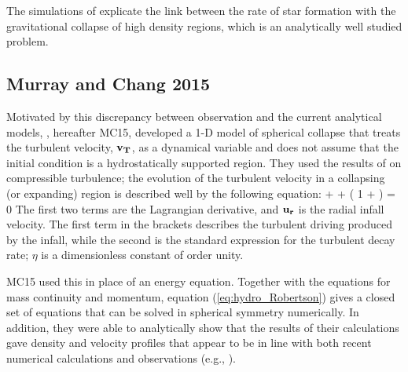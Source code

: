 \documentclass[../dissertation.tex]{subfiles}
\begin{document}
The simulations of  \citet{2015ApJ...800...49L} explicate the link between the rate of star formation with the gravitational collapse of high density regions, which  is  an analytically well studied problem. 

\subsection{Murray and Chang 2015} \label{MC15_model}

Motivated by this discrepancy between observation and the current analytical models,
\citet{2015ApJ...804...44M}, hereafter MC15, developed a 1-D model of
spherical collapse that treats the turbulent velocity, $\mathbf{v_T}$, as a dynamical variable and
does not assume that the initial condition is a hydrostatically supported region. 
They used the results of \citet{2012ApJ...750L..31R} on compressible turbulence; the evolution 
of the turbulent velocity in a collapsing (or expanding) region is described well by the following equation:
%
\be
{} + \ur {} 
+ \left( 1 + \eta \frac{\vt}{\ur} \right)  = 0
\label{eq:hydro_Robertson}
\ee
%
The first two terms are the Lagrangian derivative, and $\mathbf{u_r}$ is the radial infall velocity. The first term in the brackets 
describes the turbulent driving produced by the infall, while the second 
is the standard expression for the turbulent decay rate;  $\eta$ is a dimensionless constant of order unity.

MC15 used this in place of an energy equation. Together with the
equations for mass continuity and momentum, equation (\ref{eq:hydro_Robertson}) gives a
closed set of equations that can be solved in spherical symmetry
numerically. In addition, they were able to analytically show that the
results of their calculations gave density and velocity profiles that
appear to be in line with both recent numerical calculations
\citep{2015ApJ...800...49L} and observations (e.g.,
\citealt{1995ApJ...446..665C,1997ApJ...476..730P}).
\end{document}
